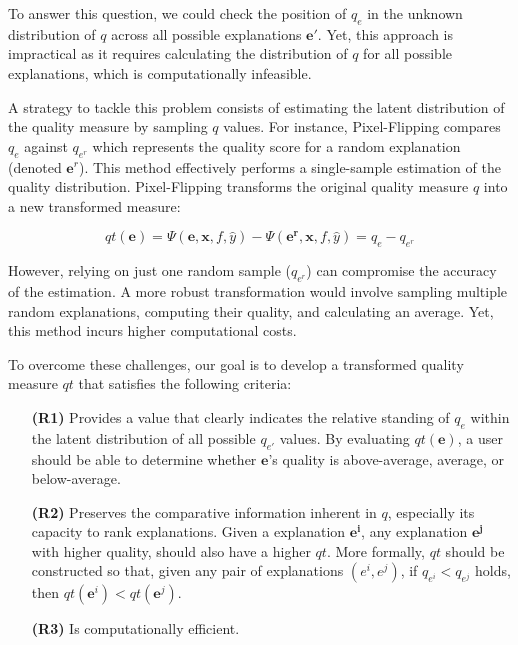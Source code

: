 To answer this question, we could check the position of $q_e$ in the unknown distribution of $q$ across all possible explanations $\mathbf{e'}$. Yet, this approach is impractical as it requires calculating the distribution of $q$ for all possible explanations, which is computationally infeasible.

A strategy to tackle this problem consists of estimating the latent distribution of the quality measure by sampling $q$ values. For instance, Pixel-Flipping \cite{bach2015pixel} compares $q_{e}$ against $q_{e^r}$ which represents the quality score for a random explanation (denoted $\mathbf{e}^r$). This method effectively performs a single-sample estimation of the quality distribution. Pixel-Flipping transforms the original quality measure $q$ into a new transformed measure:

\begin{equation}
    qt(\mathbf{e}) = \Psi(\mathbf{e}, \mathbf{x}, f, \hat{y}) - \Psi(\mathbf{e^r}, \mathbf{x}, f, \hat{y}) = q_e - q_{e^r}
    \label{eq:qt_pixel_flipping}
\end{equation}

However, relying on just one random sample ($q_{e^r}$) can compromise the accuracy of the estimation. A more robust transformation would involve sampling multiple random explanations, computing their quality, and calculating an average. Yet, this method incurs higher computational costs.

To overcome these challenges, our goal is to develop a transformed quality measure $qt$ that satisfies the following criteria:
\begin{itemize}
    \setlength\itemindent{1em} %
    \item[\textbf{(R1)}] Provides a value that clearly indicates the relative standing of $q_{e}$ within the latent distribution of all possible $q_{e'}$ values. By evaluating $qt(\mathbf{e})$, a user should be able to determine whether $\mathbf{e}$'s quality is above-average, average, or below-average.
    \item[\textbf{(R2)}] Preserves the comparative information inherent in $q$, especially its capacity to rank explanations. Given a explanation $\mathbf{e^i}$, any explanation $\mathbf{e^j}$ with higher quality, should also have a higher $qt$. More formally, $qt$ should be constructed so that, given any pair of explanations $(e^i, e^j)$, if $q_{e^i}<q_{e^j}$ holds, then $qt(\mathbf{e}^i)<qt(\mathbf{e}^j)$.
    \item[\textbf{(R3)}] Is computationally efficient.
\end{itemize}

